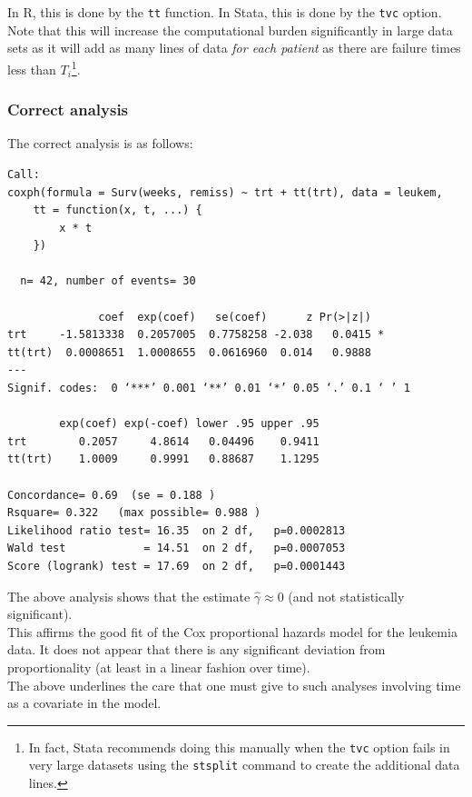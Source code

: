 \documentclass[10pt]{book}
\begin{document}
In R, this is done by the {\tt tt} function. In Stata, this is done by the {\tt tvc} option.
\\[2ex]
Note that this will increase the computational burden significantly in large data sets as it will add as many lines of data \textit{for each patient} as there are failure times less than $T_i$\footnote{In fact, Stata recommends doing this manually when the {\tt tvc} option fails in very large datasets using the {\tt stsplit} command to create the additional data lines.}.
\subsubsection{Correct analysis}
The correct analysis is as follows:
\small
\begin{verbatim}
Call:
coxph(formula = Surv(weeks, remiss) ~ trt + tt(trt), data = leukem,
    tt = function(x, t, ...) {
        x * t
    })

  n= 42, number of events= 30

              coef  exp(coef)   se(coef)      z Pr(>|z|)
trt     -1.5813338  0.2057005  0.7758258 -2.038   0.0415 *
tt(trt)  0.0008651  1.0008655  0.0616960  0.014   0.9888
---
Signif. codes:  0 ‘***’ 0.001 ‘**’ 0.01 ‘*’ 0.05 ‘.’ 0.1 ‘ ’ 1

        exp(coef) exp(-coef) lower .95 upper .95
trt        0.2057     4.8614   0.04496    0.9411
tt(trt)    1.0009     0.9991   0.88687    1.1295

Concordance= 0.69  (se = 0.188 )
Rsquare= 0.322   (max possible= 0.988 )
Likelihood ratio test= 16.35  on 2 df,   p=0.0002813
Wald test            = 14.51  on 2 df,   p=0.0007053
Score (logrank) test = 17.69  on 2 df,   p=0.0001443
\end{verbatim}
\normalsize
The above analysis shows that the estimate $\hat{\gamma}\approx 0$ (and not statistically significant).\\[2ex]
This affirms the good fit of the Cox proportional hazards model for the leukemia data.
It does not appear that there is any significant deviation from proportionality (at least in a linear fashion over time).\\[2ex]
The above underlines the care that one must give to such analyses involving time as a covariate in the model.
\end{document}
